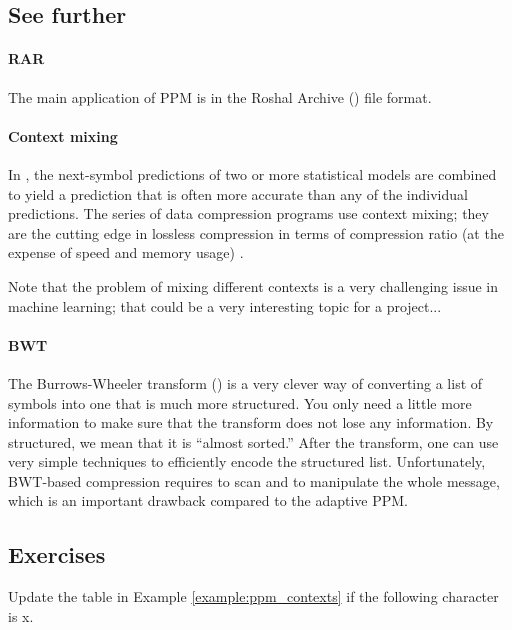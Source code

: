 \documentclass[a4paper, 11pt, openany]{book}
\begin{document}
\subsection{See further}

\paragraph{RAR} The main application of PPM is in the Roshal Archive () file format.


\paragraph{Context mixing} In , the next-symbol predictions of two or more statistical models are combined to yield a prediction that is often more accurate than any of the individual predictions. The  series of data compression programs use context mixing; they are the cutting edge in lossless compression in terms of compression ratio (at the expense of speed and memory usage) \cite{KF11}.

Note that the problem of mixing different contexts is a very challenging issue in machine learning; that could be a very interesting topic for a project...


\paragraph{BWT} The Burrows-Wheeler transform () is a very clever way of converting a list of symbols into one that is much more structured. You only need a little more information to make sure that the transform does not lose any information. By structured, we mean that it is ``almost sorted.'' After the transform, one can use very simple techniques to efficiently encode the structured list. Unfortunately, BWT-based compression requires to scan and to manipulate the whole message, which is an important drawback compared to the adaptive PPM.


\subsection{Exercises}


\begin{exercise} \label{exercise:ppm_contexts}
Update the table in Example \ref{example:ppm_contexts} if the following character is x.
\end{exercise}
\end{document}
